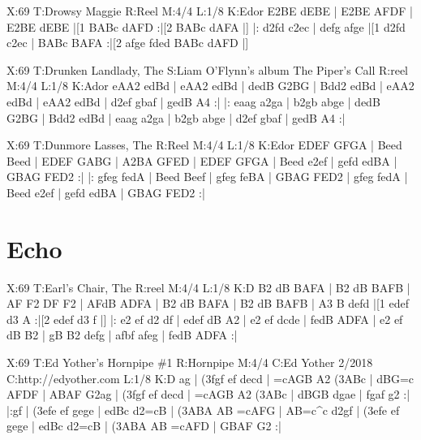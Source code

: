 \documentclass{article}
\begin{document}
\begin{abc}[name]
X:69
T:Drowsy Maggie
R:Reel
M:4/4
L:1/8
K:Edor
E2BE dEBE | E2BE AFDF | E2BE dEBE |[1 BABc dAFD :|[2 BABc dAFA |]
|: d2fd c2ec | defg afge |[1 d2fd c2ec | BABc BAFA :|[2 afge fded BABc dAFD |]
\end{abc}

\begin{abc}[name]
X:69
T:Drunken Landlady, The
S:Liam O'Flynn's album The Piper's Call
R:reel
M:4/4
L:1/8
K:Ador
eAA2 edBd | eAA2 edBd | dedB G2BG | Bdd2 edBd |
eAA2 edBd | eAA2 edBd | d2ef gbaf | gedB A4 :|
|: eaag a2ga | b2gb abge | dedB G2BG | Bdd2 edBd |
eaag a2ga | b2gb abge | d2ef gbaf | gedB A4 :|
\end{abc}

\begin{abc}[name]
X:69
T:Dunmore Lasses, The
R:Reel
M:4/4
L:1/8
K:Edor
EDEF GFGA | Beed Beed | EDEF GABG | A2BA GFED |
EDEF GFGA | Beed e2ef | gefd edBA | GBAG FED2 :|
|: gfeg fedA | Beed Beef | gfeg feBA | GBAG FED2 |
gfeg fedA | Beed e2ef | gefd edBA | GBAG FED2 :|
\end{abc}

\section{Echo}

\begin{abc}[name]
X:69
T:Earl's Chair, The
R:reel
M:4/4
L:1/8
K:D
B2 dB BAFA | B2 dB BAFB | AF F2 DF F2 | AFdB ADFA |
B2 dB BAFA | B2 dB BAFB | A3 B defd |[1 edef d3 A :|[2 edef d3 f |]
|: e2 ef d2 df | edef dB A2 | e2 ef dcde | fedB ADFA |
e2 ef dB B2 | gB B2 defg | afbf afeg | fedB ADFA :|
\end{abc}

\begin{abc}[name]
X:69
T:Ed Yother's Hornpipe \#1
R:Hornpipe
M:4/4
C:Ed Yother 2/2018
C:http://edyother.com
L:1/8
K:D
ag | (3fgf ef decd | =cAGB A2 (3ABc | dBG=c AFDF | ABAF G2ag |
(3fgf ef decd | =cAGB A2 (3ABc | dBGB dgae | fgaf g2 :|
|:gf | (3efe ef gege | edBc d2=cB | (3ABA AB =cAFG | AB=c^c d2gf |
(3efe ef gege | edBc d2=cB | (3ABA AB =cAFD | GBAF G2 :|
\end{abc}
\end{document}

